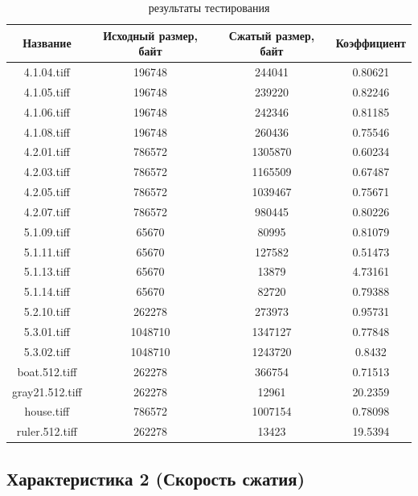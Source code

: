 \documentclass[a4paper,oneside]{article}
\theoremstyle{definition}
\begin{document}
\begin{table}[H]
  \small
  \centering
  \begin{tabular}{|c|c|c|c|}
    \hline
    Название     & Исходный размер, байт & Сжатый размер, байт & Коэффициент \\ \hline \hline
    4.1.04.tiff     &  196748 &  244041 & 0.80621 \\ \hline
    4.1.05.tiff     &  196748 &  239220 & 0.82246 \\ \hline
    4.1.06.tiff     &  196748 &  242346 & 0.81185 \\ \hline
    4.1.08.tiff     &  196748 &  260436 & 0.75546 \\ \hline
    4.2.01.tiff     &  786572 & 1305870 & 0.60234 \\ \hline
    4.2.03.tiff     &  786572 & 1165509 & 0.67487 \\ \hline
    4.2.05.tiff     &  786572 & 1039467 & 0.75671 \\ \hline
    4.2.07.tiff     &  786572 &  980445 & 0.80226 \\ \hline
    5.1.09.tiff     &   65670 &   80995 & 0.81079 \\ \hline
    5.1.11.tiff     &   65670 &  127582 & 0.51473 \\ \hline
    5.1.13.tiff     &   65670 &   13879 & 4.73161 \\ \hline
    5.1.14.tiff     &   65670 &   82720 & 0.79388 \\ \hline
    5.2.10.tiff     &  262278 &  273973 & 0.95731 \\ \hline
    5.3.01.tiff     & 1048710 & 1347127 & 0.77848 \\ \hline
    5.3.02.tiff     & 1048710 & 1243720 & 0.8432  \\ \hline
    boat.512.tiff   &  262278 &  366754 & 0.71513 \\ \hline
    gray21.512.tiff &  262278 &   12961 & 20.2359 \\ \hline
    house.tiff      &  786572 & 1007154 & 0.78098 \\ \hline
    ruler.512.tiff  &  262278 &   13423 & 19.5394 \\ \hline
  \end{tabular}
  \caption{результаты тестирования}
  \label{tbl:results}
\end{table}

\subsection{Характеристика 2 (Скорость сжатия)}
\end{document}
